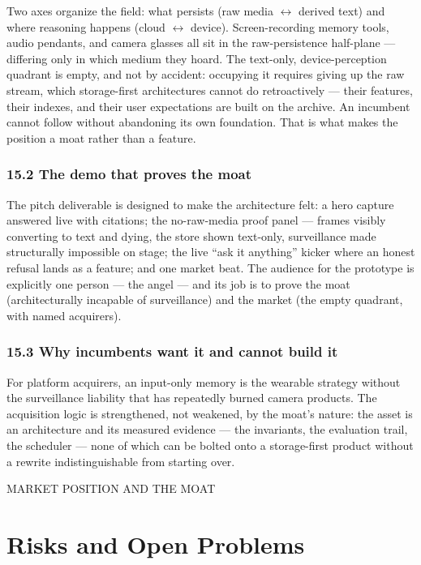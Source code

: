 Two axes organize the field: what persists (raw media \(\leftrightarrow\) derived text) and where reasoning happens (cloud \(\leftrightarrow\) device). Screen-recording memory tools, audio pendants, and camera glasses all sit in the raw-persistence half-plane --- differing only in which medium they hoard. The text-only, device-perception quadrant is empty, and not by accident: occupying it requires giving up the raw stream, which storage-first architectures cannot do retroactively --- their features, their indexes, and their user expectations are built on the archive. An incumbent cannot follow without abandoning its own foundation. That is what makes the position a moat rather than a feature.

\subsection{15.2 The demo that proves the moat}\label{the-demo-that-proves-the-moat}

The pitch deliverable is designed to make the architecture felt: a hero capture answered live with citations; the no-raw-media proof panel --- frames visibly converting to text and dying, the store shown text-only, surveillance made structurally impossible on stage; the live ``ask it anything'' kicker where an honest refusal lands as a feature; and one market beat. The audience for the prototype is explicitly one person --- the angel --- and its job is to prove the moat (architecturally incapable of surveillance) and the market (the empty quadrant, with named acquirers).

\subsection{15.3 Why incumbents want it and cannot build it}\label{why-incumbents-want-it-and-cannot-build-it}

For platform acquirers, an input-only memory is the wearable strategy without the surveillance liability that has repeatedly burned camera products. The acquisition logic is strengthened, not weakened, by the moat's nature: the asset is an architecture and its measured evidence --- the invariants, the evaluation trail, the scheduler --- none of which can be bolted onto a storage-first product without a rewrite indistinguishable from starting over.

MARKET POSITION AND THE MOAT

\chapter{Risks and Open Problems}\label{risks-and-open-problems}

